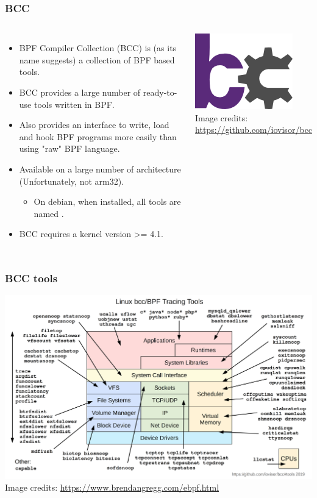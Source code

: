\begin{frame}[fragile]
  \frametitle{BCC}
  \begin{columns}
    \begin{itemize}
      \item BPF Compiler Collection (BCC) is (as its name suggests) a collection
            of BPF based tools.
      \item BCC provides a large number of ready-to-use tools written in BPF.
      \item Also provides an interface to write, load and hook BPF programs more
            easily than using "raw" BPF language.
      \item Available on a large number of architecture (Unfortunately, not arm32).
      \begin{itemize}
        \item On debian, when installed, all tools are named .
      \end{itemize}
      \item BCC requires a kernel version >= 4.1.
    \end{itemize}
  \vspace{0.5cm}
  \includegraphics[height=0.2\textheight]{slides/debugging-linux-application-stack/logo_bcc.png}\\ 
  \tiny Image credits: \url{https://github.com/iovisor/bcc}
  \end{columns}
\end{frame}

\begin{frame}[fragile]
  \frametitle{BCC tools}
  \begin{center}
    \includegraphics[height=0.8\textheight]{slides/debugging-system-wide-profiling/bcc_tracing_tools_2019.png}\\
    \tiny Image credits: \url{https://www.brendangregg.com/ebpf.html}
  \end{center}
\end{frame}

